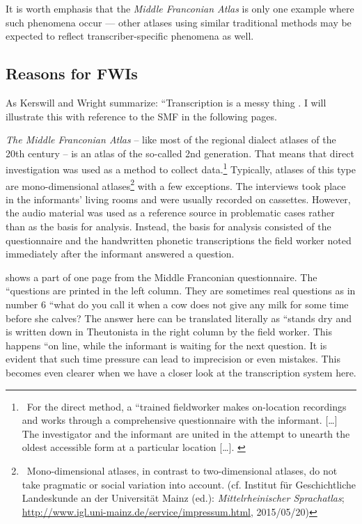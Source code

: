\documentclass[output=paper]{LSP/langsci}
\begin{document}
It is worth emphasis that the \textit{Middle Franconian Atlas} is only one example where such phenomena occur — other atlases using similar traditional methods may be expected to reflect transcriber-specific phenomena as well.

\subsection{Reasons for FWIs}
As Kerswill and Wright summarize: ``Transcription is a messy thing{\textquotedbl} \citep[273]{kerswill_limits_1990}. I will illustrate this with reference to the SMF in the following pages.

\textit{The Middle Franconian Atlas} – like most of the regional dialect atlases of the 20th century – is an atlas of the so-called 2nd generation. That means that direct investigation was used as a method to collect data.\footnote{\ For the direct method, a ``trained fieldworker makes on-location recordings and works through a comprehensive questionnaire with the informant. […] The investigator and the informant are united in the attempt to unearth the oldest accessible form at a particular location […].{\textquotedbl} \citep[502]{konig_investigating_2010}} Typically, atlases of this type are mono-dimensional atlases\footnote{\ Mono-dimensional atlases, in contrast to two-dimensional atlases, do not take pragmatic or social variation into account. (cf. \citealt{bellmann_mittelrheinischer_????} Institut für Geschichtliche Landeskunde an der Universität Mainz (ed.): \textit{Mittelrheinischer Sprachatlas}; \url{http://www.igl.uni-mainz.de/service/impressum.html}, 2015/05/20)} with a few exceptions. The interviews took place in the informants' living rooms and were usually recorded on cassettes. However, the audio material was used as a reference source in problematic cases rather than as the basis for analysis. Instead, the basis for analysis consisted of the questionnaire and the handwritten phonetic transcriptions the field worker noted immediately after the informant answered a question.

 shows a part of one page from the Middle Franconian questionnaire. The ``questions{\textquotedbl} are printed in the left column. They are sometimes real questions as in number 6 ``what do you call it when a cow does not give any milk for some time before she calves?{\textquotedbl} The answer here can be translated literally as ``stands dry{\textquotedbl} and is written down in Theutonista in the right column by the field worker. This happens  ``on line{\textquotedbl}, while the informant is waiting for the next question. It is evident that such time pressure can lead to imprecision or even mistakes. This becomes even clearer when we have a closer look at the transcription system here.
\end{document}
